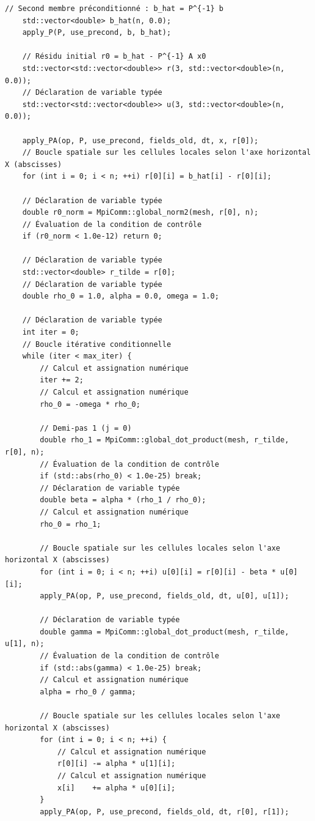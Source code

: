 \documentclass[10pt,a4paper,oneside]{book}
\begin{document}
\begin{lstlisting}[language={[11]C++}]
    // Second membre préconditionné : b_hat = P^{-1} b
    std::vector<double> b_hat(n, 0.0);
    apply_P(P, use_precond, b, b_hat);

    // Résidu initial r0 = b_hat - P^{-1} A x0
    std::vector<std::vector<double>> r(3, std::vector<double>(n, 0.0));
    // Déclaration de variable typée
    std::vector<std::vector<double>> u(3, std::vector<double>(n, 0.0));

    apply_PA(op, P, use_precond, fields_old, dt, x, r[0]);
    // Boucle spatiale sur les cellules locales selon l'axe horizontal X (abscisses)
    for (int i = 0; i < n; ++i) r[0][i] = b_hat[i] - r[0][i];

    // Déclaration de variable typée
    double r0_norm = MpiComm::global_norm2(mesh, r[0], n);
    // Évaluation de la condition de contrôle
    if (r0_norm < 1.0e-12) return 0;

    // Déclaration de variable typée
    std::vector<double> r_tilde = r[0];
    // Déclaration de variable typée
    double rho_0 = 1.0, alpha = 0.0, omega = 1.0;

    // Déclaration de variable typée
    int iter = 0;
    // Boucle itérative conditionnelle
    while (iter < max_iter) {
        // Calcul et assignation numérique
        iter += 2;
        // Calcul et assignation numérique
        rho_0 = -omega * rho_0;

        // Demi-pas 1 (j = 0)
        double rho_1 = MpiComm::global_dot_product(mesh, r_tilde, r[0], n);
        // Évaluation de la condition de contrôle
        if (std::abs(rho_0) < 1.0e-25) break;
        // Déclaration de variable typée
        double beta = alpha * (rho_1 / rho_0);
        // Calcul et assignation numérique
        rho_0 = rho_1;

        // Boucle spatiale sur les cellules locales selon l'axe horizontal X (abscisses)
        for (int i = 0; i < n; ++i) u[0][i] = r[0][i] - beta * u[0][i];
        apply_PA(op, P, use_precond, fields_old, dt, u[0], u[1]);

        // Déclaration de variable typée
        double gamma = MpiComm::global_dot_product(mesh, r_tilde, u[1], n);
        // Évaluation de la condition de contrôle
        if (std::abs(gamma) < 1.0e-25) break;
        // Calcul et assignation numérique
        alpha = rho_0 / gamma;

        // Boucle spatiale sur les cellules locales selon l'axe horizontal X (abscisses)
        for (int i = 0; i < n; ++i) {
            // Calcul et assignation numérique
            r[0][i] -= alpha * u[1][i];
            // Calcul et assignation numérique
            x[i]    += alpha * u[0][i];
        }
        apply_PA(op, P, use_precond, fields_old, dt, r[0], r[1]);


\end{lstlisting}
\end{document}
